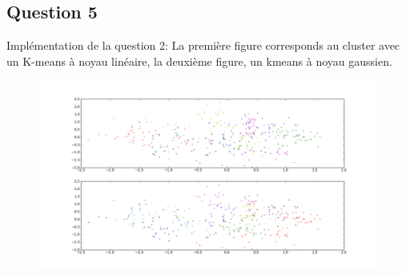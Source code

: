 \documentclass{article}
\begin{document}
\subsection{Question 5}

Implémentation de la question 2:
La première figure corresponds au cluster avec un K-means à noyau linéaire, la
deuxième figure, un kmeans à noyau gaussien.

\begin{figure}
\begin{center}
\includegraphics[width=550px]{./clusters.png}
\end{center}
\end{figure}
\end{document}
